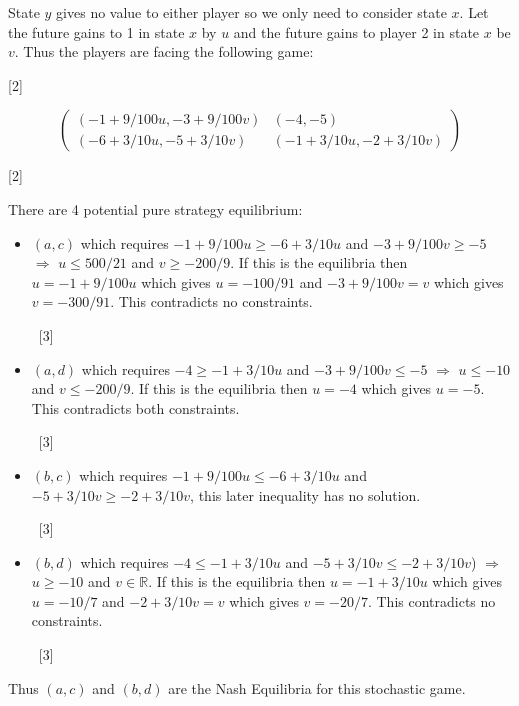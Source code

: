 \documentclass[12pt,a4paper]{article}
\makeatletter
\renewcommand{\@oddfoot}{\hfil \arabic{page} \hfil}    %
\makeatother
\begin{document}
\begin{enumerate}
\begin{enumerate}
        State \(y\) gives no value to either player so we only need to consider state \(x\). Let the future gains to 1 in state \(x\) by \(u\) and the future gains to player 2 in state \(x\) be \(v\). Thus the players are facing the following game:

        \hfill[2]

        \[\begin{pmatrix}
        (-1+9/100u,-3+9/100v)&(-4,-5)\\
        (-6+3/10u,-5+3/10v)&(-1+3/10u,-2+3/10v)
        \end{pmatrix}\]

        \hfill[2]

        There are 4 potential pure strategy equilibrium:

        \begin{itemize}
            \item \((a,c)\) which requires \(-1+9/100u\geq -6+3/10u\) and
                \(-3+9/100v\geq -5\) \(\Rightarrow\) \(u\leq 500/21\) and
                \(v\geq -200/9\). If this is the equilibria then \(u=-1+9/100u\)
                which gives \(u=-100/91\) and \(-3+9/100v=v\) which gives
                \(v=-300/91\). This contradicts no constraints.

                ~\hfill[3]

            \item \((a,d)\) which requires \(-4\geq -1+3/10u\) and
                \(-3+9/100v\leq -5\) \(\Rightarrow\) \(u\leq -10\) and
                \(v\leq -200/9\). If this is the equilibria then \(u=-4\)
                which gives \(u=-5\). This contradicts both constraints.

                ~\hfill[3]

            \item \((b,c)\) which requires \(-1+9/100u\leq -6+3/10u\) and
                \(-5+3/10v\geq -2+3/10v\), this later inequality has no
                solution.

                ~\hfill[3]

            \item \((b,d)\) which requires \(-4\leq -1+3/10u\) and
                \(-5+3/10v\leq -2+3/10v\)) \(\Rightarrow\) \(u\geq -10\) and
                \(v \in \mathbb{R}\). If this is the equilibria then \(u=-1+3/10u\)
                which gives \(u=-10/7\) and \(-2+3/10v=v\) which gives
                \(v=-20/7\). This contradicts no constraints.

                ~\hfill[3]
        \end{itemize}

        Thus \((a,c)\) and \((b,d)\) are the Nash Equilibria for this stochastic
        game.

    \end{enumerate}
\end{enumerate}


\makeatletter
\renewcommand{\@oddfoot}{\hfil \arabic{page}X \hfil}    %
\makeatother
\end{document}
